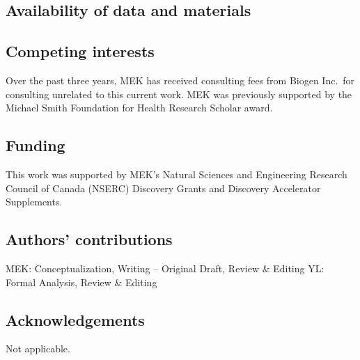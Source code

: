 \documentclass[sn-vancouver,Numbered,lineno,pdflatex]{sn-jnl}
\begin{document}
\subsection*{Availability of data and
materials}\label{availability-of-data-and-materials}

\subsection*{Competing interests}\label{competing-interests}

Over the past three years, MEK has received consulting fees from Biogen
Inc.~for consulting unrelated to this current work. MEK was previously
supported by the Michael Smith Foundation for Health Research Scholar
award.

\subsection*{Funding}\label{funding}

This work was supported by MEK's Natural Sciences and Engineering
Research Council of Canada (NSERC) Discovery Grants and Discovery
Accelerator Supplements.

\subsection*{Authors' contributions}\label{authors-contributions}

MEK: Conceptualization, Writing -- Original Draft, Review \& Editing YL:
Formal Analysis, Review \& Editing

\subsection*{Acknowledgements}\label{acknowledgements}

Not applicable.

\renewcommand\refname{References}

\end{document}
